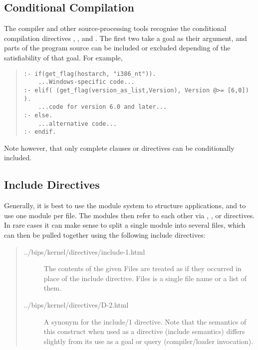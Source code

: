 \subsection{Conditional Compilation}

The compiler and other source-processing tools recognise the conditional
compilation directives , ,  and
. The first two
take a goal as their argument, and parts of the program source can be
included or excluded depending of the satisfiability of that goal.
For example,
\begin{quote}
\begin{verbatim}
:- if(get_flag(hostarch, "i386_nt")).
    ...Windows-specific code...
:- elif( (get_flag(version_as_list,Version), Version @>= [6,0]) ).
    ...code for version 6.0 and later...
:- else.
    ...alternative code...
:- endif.
\end{verbatim}
\end{quote}
Note however, that only complete clauses or directives can be
conditionally included.


\subsection{Include Directives}
\label{secinclude}

Generally, it is best to use the module system to structure {\eclipse}
applications, and to use one module per file.  The modules then refer
to each other via , , or
 directives.
In rare cases it can make sense to split a single module into several
files, which can then be pulled together using the following include
directives:

\begin{quote}
\begin{description}
\item[%
{../bips/kernel/directives/include-1.html}]
The contents of the given Files are treated as if they occurred in place of
the include directive.  Files is a single file name or a list of them.

\item[%
{../bips/kernel/directives/D-2.html}]
A synonym for the include/1 directive.  Note that the semantics of this
construct when used as a directive (include semantics) differs slightly
from its use as a goal or query (compiler/loader invocation).
\end{description}
\end{quote}

